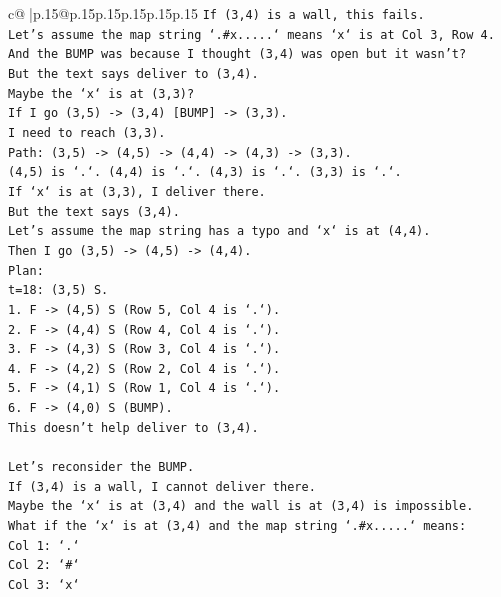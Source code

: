 \documentclass{article}
\begin{document}
{\begin{supertabular}{c@{$\;$}|p{.15\linewidth}@{}p{.15\linewidth}p{.15\linewidth}p{.15\linewidth}p{.15\linewidth}p{.15\linewidth}}
{{{\texttt{If (3,4) is a wall, this fails.} \\
\texttt{Let's assume the map string `.\#x.....` means `x` is at Col 3, Row 4.} \\
\texttt{And the BUMP was because I thought (3,4) was open but it wasn't?} \\
\texttt{But the text says deliver to (3,4).} \\
\texttt{Maybe the `x` is at (3,3)?} \\
\texttt{If I go (3,5) {-}> (3,4) {[}BUMP{]} {-}> (3,3).} \\
\texttt{I need to reach (3,3).} \\
\texttt{Path: (3,5) {-}> (4,5) {-}> (4,4) {-}> (4,3) {-}> (3,3).} \\
\texttt{(4,5) is `.`. (4,4) is `.`. (4,3) is `.`. (3,3) is `.`.} \\
\texttt{If `x` is at (3,3), I deliver there.} \\
\texttt{But the text says (3,4).} \\
\texttt{Let's assume the map string has a typo and `x` is at (4,4).} \\
\texttt{Then I go (3,5) {-}> (4,5) {-}> (4,4).} \\
\texttt{Plan:} \\
\texttt{t=18: (3,5) S.} \\
\texttt{1. F {-}> (4,5) S (Row 5, Col 4 is `.`).} \\
\texttt{2. F {-}> (4,4) S (Row 4, Col 4 is `.`).} \\
\texttt{3. F {-}> (4,3) S (Row 3, Col 4 is `.`).} \\
\texttt{4. F {-}> (4,2) S (Row 2, Col 4 is `.`).} \\
\texttt{5. F {-}> (4,1) S (Row 1, Col 4 is `.`).} \\
\texttt{6. F {-}> (4,0) S (BUMP).} \\
\texttt{This doesn't help deliver to (3,4).} \\
\\ 
\texttt{Let's reconsider the BUMP.} \\
\texttt{If (3,4) is a wall, I cannot deliver there.} \\
\texttt{Maybe the `x` is at (3,4) and the wall is at (3,4) is impossible.} \\
\texttt{What if the `x` is at (3,4) and the map string `.\#x.....` means:} \\
\texttt{Col 1: `.`} \\
\texttt{Col 2: `\#`} \\
\texttt{Col 3: `x`} \\
}}}
\end{supertabular}}
\end{document}
